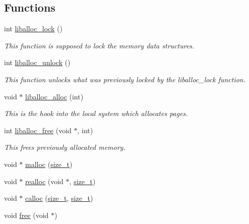 \subsection*{Functions}
\begin{DoxyCompactItemize}
\item 
int \hyperlink{a00026_a8b5670e4594b0b6f8be78fe17f0c3b53_a8b5670e4594b0b6f8be78fe17f0c3b53}{liballoc\+\_\+lock} ()
\begin{DoxyCompactList}\small\item\em This function is supposed to lock the memory data structures. \end{DoxyCompactList}\item 
int \hyperlink{a00026_aedc23f198b2882d41d0caa316453967b_aedc23f198b2882d41d0caa316453967b}{liballoc\+\_\+unlock} ()
\begin{DoxyCompactList}\small\item\em This function unlocks what was previously locked by the liballoc\+\_\+lock function. \end{DoxyCompactList}\item 
void $\ast$ \hyperlink{a00026_ae002bb742dfc63fe18a305bd14bdf692_ae002bb742dfc63fe18a305bd14bdf692}{liballoc\+\_\+alloc} (int)
\begin{DoxyCompactList}\small\item\em This is the hook into the local system which allocates pages. \end{DoxyCompactList}\item 
int \hyperlink{a00026_a1653870893230580e5d605148aa3c37a_a1653870893230580e5d605148aa3c37a}{liballoc\+\_\+free} (void $\ast$, int)
\begin{DoxyCompactList}\small\item\em This frees previously allocated memory. \end{DoxyCompactList}\item 
void $\ast$ \hyperlink{a00026_a1c8580582aae58105f16108d4ec89e9a_a1c8580582aae58105f16108d4ec89e9a}{malloc} (\hyperlink{a00026_a7c94ea6f8948649f8d181ae55911eeaf_a7c94ea6f8948649f8d181ae55911eeaf}{size\+\_\+t})
\item 
void $\ast$ \hyperlink{a00026_afa148085b6fa9594b4c35e100d94a183_afa148085b6fa9594b4c35e100d94a183}{realloc} (void $\ast$, \hyperlink{a00026_a7c94ea6f8948649f8d181ae55911eeaf_a7c94ea6f8948649f8d181ae55911eeaf}{size\+\_\+t})
\item 
void $\ast$ \hyperlink{a00026_a77e880b1033d5a912be4333fc5d31eef_a77e880b1033d5a912be4333fc5d31eef}{calloc} (\hyperlink{a00026_a7c94ea6f8948649f8d181ae55911eeaf_a7c94ea6f8948649f8d181ae55911eeaf}{size\+\_\+t}, \hyperlink{a00026_a7c94ea6f8948649f8d181ae55911eeaf_a7c94ea6f8948649f8d181ae55911eeaf}{size\+\_\+t})
\item 
void \hyperlink{a00026_af07d89f5ceaea0c7c8252cc41fd75f37_af07d89f5ceaea0c7c8252cc41fd75f37}{free} (void $\ast$)
\end{DoxyCompactItemize}


